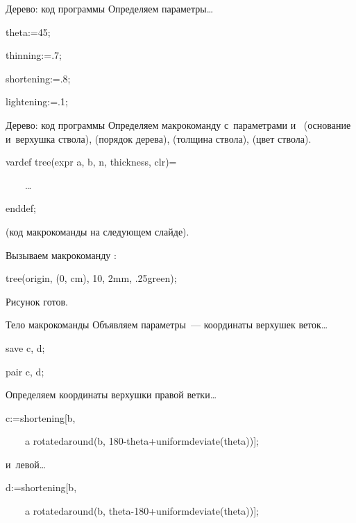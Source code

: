 \begin{frame}{Дерево: код программы}
Определяем параметры…
\begin{programlisting}
theta:=45;\par
thinning:=.7;\par
shortening:=.8;\par
lightening:=.1;
\end{programlisting}
\end{frame}

\begin{frame}{Дерево: код программы}
Определяем макрокоманду  с~параметрами  и~
(основание и~верхушка ствола),  (порядок дерева),
 (толщина ствола),  (цвет ствола).
\begin{programlisting}
vardef tree(expr a, b, n, thickness, clr)=\par
~~~~…\par
enddef;
\end{programlisting}
(код макрокоманды на следующем слайде).

Вызываем макрокоманду :
\begin{programlisting}
tree(origin, (0, cm), 10, 2mm, .25green);
\end{programlisting}

Рисунок готов.
\end{frame}

\begin{frame}{Тело макрокоманды }
Объявляем параметры~— координаты верхушек веток…
\begin{programlisting}
save c, d;\par
pair c, d;
\end{programlisting}

Определяем координаты верхушки правой ветки…
\begin{programlisting}
c:=shortening[b,\par
~~~~a rotatedaround(b, 180-theta+uniformdeviate(theta))];
\end{programlisting}
и~левой…
\begin{programlisting}
d:=shortening[b,\par
~~~~a rotatedaround(b, theta-180+uniformdeviate(theta))];
\end{programlisting}
\end{frame}

